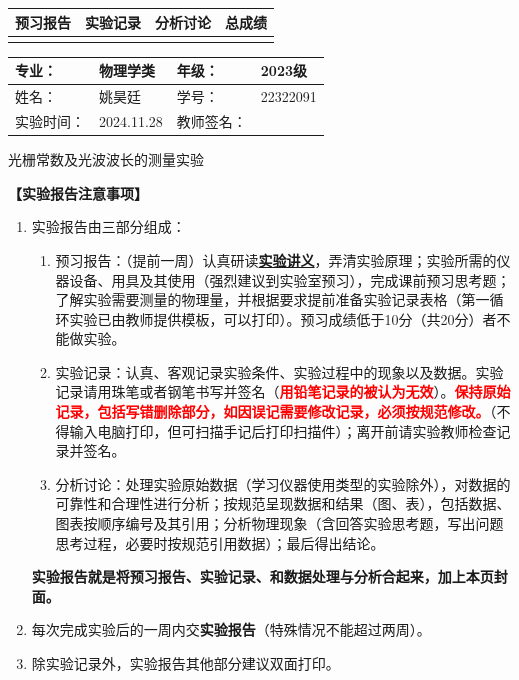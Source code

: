 \documentclass[dvipsnames, svgnames,a4paper,11pt]{article}
\begin{document}
\begin{table}
	\renewcommand\arraystretch{1.7}
	\begin{tabularx}{\textwidth}{
		|X|X|X|X
		|X|X|X|X|}
	\hline
	\multicolumn{2}{|c|}{预习报告}&\multicolumn{2}{|c|}{实验记录}&\multicolumn{2}{|c|}{分析讨论}&\multicolumn{2}{|c|}{总成绩}\\
	\hline
	 & &  & &  & &  & \\
	\hline
	\end{tabularx}
\end{table}


\begin{table}
	\renewcommand\arraystretch{1.7}
	\begin{tabularx}{\textwidth}{|X|X|X|X|}
	\hline
	专业：& 物理学类 &年级：& 2023级\\
	\hline
	姓名：& 姚昊廷  & 学号：&22322091\\
	\hline
	实验时间：& 2024.11.28& 教师签名：& \\
	\hline
	\end{tabularx}
\end{table}

\begin{center}
	\LARGE 光栅常数及光波波长的测量实验
\end{center}

\textbf{【实验报告注意事项】}
\begin{enumerate}
	\item 实验报告由三部分组成：
	\begin{enumerate}
		\item 预习报告：（提前一周）认真研读\underline{\textbf{实验讲义}}，弄清实验原理；实验所需的仪器设备、用具及其使用（强烈建议到实验室预习），完成课前预习思考题；了解实验需要测量的物理量，并根据要求提前准备实验记录表格（第一循环实验已由教师提供模板，可以打印）。预习成绩低于10分（共20分）者不能做实验。
	    \item 实验记录：认真、客观记录实验条件、实验过程中的现象以及数据。实验记录请用珠笔或者钢笔书写并签名（\textcolor{red}{\textbf{用铅笔记录的被认为无效}}）。\textcolor{red}{\textbf{保持原始记录，包括写错删除部分，如因误记需要修改记录，必须按规范修改。}}（不得输入电脑打印，但可扫描手记后打印扫描件）；离开前请实验教师检查记录并签名。
	    \item 分析讨论：处理实验原始数据（学习仪器使用类型的实验除外），对数据的可靠性和合理性进行分析；按规范呈现数据和结果（图、表），包括数据、图表按顺序编号及其引用；分析物理现象（含回答实验思考题，写出问题思考过程，必要时按规范引用数据）；最后得出结论。
	\end{enumerate}
	\textbf{实验报告就是将预习报告、实验记录、和数据处理与分析合起来，加上本页封面。}
	\item 每次完成实验后的一周内交\textbf{实验报告}（特殊情况不能超过两周）。
	\item 除实验记录外，实验报告其他部分建议双面打印。
\end{enumerate}
\end{document}
